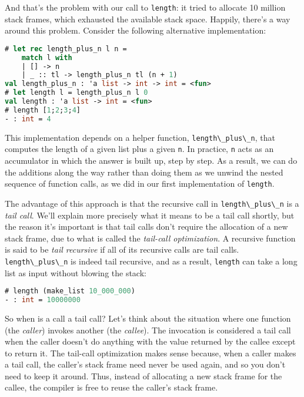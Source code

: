And that's the problem with our call to
\passthrough{\lstinline!length!}: it tried to allocate 10 million stack
frames, which exhausted the available stack space. Happily, there's a
way around this problem. Consider the following alternative
implementation:

\begin{lstlisting}[language=Caml]
# let rec length_plus_n l n =
    match l with
    | [] -> n
    | _ :: tl -> length_plus_n tl (n + 1)
val length_plus_n : 'a list -> int -> int = <fun>
# let length l = length_plus_n l 0
val length : 'a list -> int = <fun>
# length [1;2;3;4]
- : int = 4
\end{lstlisting}

This implementation depends on a helper function,
\passthrough{\lstinline!length\_plus\_n!}, that computes the length of a
given list plus a given \passthrough{\lstinline!n!}. In practice,
\passthrough{\lstinline!n!} acts as an accumulator in which the answer
is built up, step by step. As a result, we can do the additions along
the way rather than doing them as we unwind the nested sequence of
function calls, as we did in our first implementation of
\passthrough{\lstinline!length!}.

The advantage of this approach is that the recursive call in
\passthrough{\lstinline!length\_plus\_n!} is a \emph{tail call}. We'll
explain more precisely what it means to be a tail call shortly, but the
reason it's important is that tail calls don't require the allocation of
a new stack frame, due to what is called the \emph{tail-call
optimization}. A recursive function is said to be \emph{tail recursive}
if all of its recursive calls are tail calls.
\passthrough{\lstinline!length\_plus\_n!} is indeed tail recursive, and
as a result, \passthrough{\lstinline!length!} can take a long list as
input without blowing the stack:

\begin{lstlisting}[language=Caml]
# length (make_list 10_000_000)
- : int = 10000000
\end{lstlisting}

So when is a call a tail call? Let's think about the situation where one
function (the \emph{caller}) invokes another (the \emph{callee}). The
invocation is considered a tail call when the caller doesn't do anything
with the value returned by the callee except to return it. The tail-call
optimization makes sense because, when a caller makes a tail call, the
caller's stack frame need never be used again, and so you don't need to
keep it around. Thus, instead of allocating a new stack frame for the
callee, the compiler is free to reuse the caller's stack frame.

